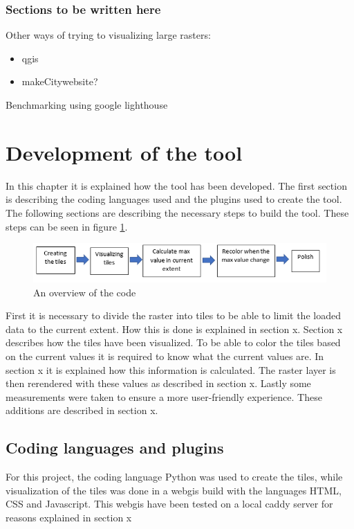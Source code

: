 \section{Sections to be written here} 

Other ways of trying to visualizing large rasters:

\begin{itemize}
	\item qgis
	\item makeCitywebsite?
\end{itemize}

Benchmarking using google lighthouse


\part{Development of the tool}
In this chapter it is explained how the tool has been developed. The first section is describing the coding languages used and the plugins used to create the tool. The following sections are describing the necessary steps to build the tool. These steps can be seen in figure \ref{DevelopmentSteps}.

\begin{figure} [H]
	\centering
	\includegraphics[width=.8\textwidth]{Pictures/DevelopmentSteps}
	\caption{An overview of the code}
	\label{DevelopmentSteps}
\end{figure}

First it is necessary to divide the raster into tiles to be able to limit the loaded data to the current extent. How this is done is explained in section x. Section x describes how the tiles have been visualized. To be able to color the tiles based on the current values it is required to know what the current values are. In section x it is explained how this information is calculated. The raster layer is then rerendered with these values as described in section x. Lastly some measurements were taken to ensure a more user-friendly experience. These additions are described in section x. 

\chapter{Coding languages and plugins}
For this project, the coding language Python was used to create the tiles, while visualization of the tiles was done in a webgis build with the languages HTML, CSS and Javascript. This webgis have been tested on a local caddy server for reasons explained in section x

